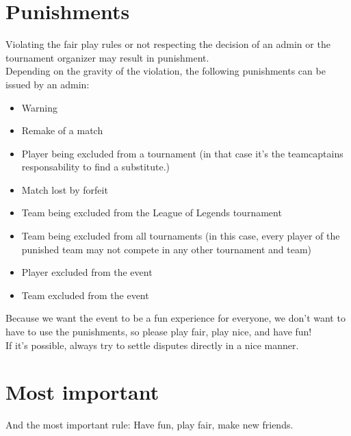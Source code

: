 \documentclass{article}
\begin{document}
\section{Punishments}
Violating the fair play rules or not respecting the decision of an admin or the tournament organizer may result in punishment.
\\
Depending on the gravity of the violation, the following punishments can be issued by an admin:
\begin{itemize}
	\item Warning
	\item Remake of a match
	\item Player being excluded from a tournament (in that case it's the teamcaptains responsability to find a substitute.)
	\item Match lost by forfeit
	\item Team being excluded from the League of Legends tournament
	\item Team being excluded from all tournaments (in this case, every player of the punished team may not compete in any other tournament and team)
	\item Player excluded from the event
	\item Team excluded from the event
\end{itemize}
Because we want the event to be a fun experience for everyone, we don't want to have to use the punishments, so please play fair, play nice, and have fun!
\\
If it's possible, always try to settle disputes directly in a nice manner.

\section{Most important}
And the most important rule: Have fun, play fair, make new friends.
\end{document}
